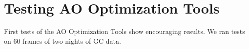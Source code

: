 \section{Testing AO Optimization Tools}
\label{sec:testing}

First tests of the AO Optimization Tools show encouraging results. We ran tests on 60 frames of two nights of GC data.
